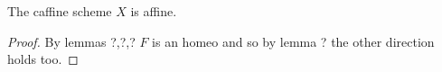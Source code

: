 \begin{proposition}
The caffine scheme $X$ is affine.
\end{proposition}

\begin{proof}
By lemmas ?,?,? $F$ is an homeo and so by lemma ? the other direction holds too.
\end{proof}